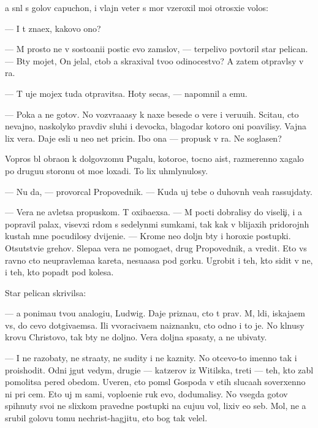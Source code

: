 \documentclass[10pt]{book}
\begin{document}
{\Y}a sn{\ia}l s golov{\yi} capuchon, i vlajn{\yi}{\y} veter s mor{\ia} vz{\y}eroxil mo{\y}i otrosxi{\y}e volos{\yi}:

— I t{\yi} zna{\y}ex, kakovo ono?

— M{\yi} prosto ne v sosto{\y}ani{\y}i postic {\Y}evo zam{\yi}slov, — terpelivo povtoril star{\yi}{\y} pelican. — B{\yi}ty mojet, On jelal, ctob{\yi} {\y}a skraxival tvo{\y}o odinocestvo? A zatem otpravl{\io}sy v ra{\y}.

— T{\yi} uje mojex tuda otpravitsa. Hoty se{\y}cas, — napomnil {\y}a {\y}emu.

— Poka {\y}a ne gotov. No vozvra{\x}a{\y}asy k naxe{\y} besede o vere i veru{\y}u{\x}ih. Scita{\y}u, cto nevajno, naskolyko pravdiv{\yi} sluhi i devocka, blagodar{\ia} kotoro{\y} oni po{\y}avilisy. Vajna lix vera. Daje {\y}esli u ne{\y}o net pricin{\yi}. Ibo ona — propusk v ra{\y}. Ne soglasen?

Vopros b{\yi}l obra{\x}on k dolgov{\ia}zomu Pugalu, kotoro{\y}e, tocno aist, razmerenno xagalo po drugu{\y}u storonu ot mo{\y}e{\y} loxadi. To lix uhm{\yi}lynulosy.

— Nu da, — provorcal Propovednik. — Kuda uj tebe o duhovn{\yi}h ve{\x}ah rassujdaty.

— Vera ne {\y}avl{\ia}{\y}etsa propuskom. T{\yi} oxiba{\y}exsa. — M{\yi} pocti dobralisy do viseli{\c}i, i {\y}a popravil palax, visevxi{\y} r{\ia}dom s sedelyn{\yi}mi sumkami, tak kak v blija{\y}xih pridorojn{\yi}h kustah mne pocudilosy dvijeni{\y}e. — Krome ne{\y}o doljn{\yi} b{\yi}ty i horoxi{\y}e postupki. Otsutstvi{\y}e grehov. Slepa{\y}a vera ne pomoga{\y}et, drug Propovednik, a vredit. Eto vs{\e} ravno cto neupravl{\ia}{\y}ema{\y}a kareta, nesu{\x}a{\y}asa pod gorku. Ugrobit i teh, kto sidit v ne{\y}, i teh, kto popad{\e}t pod kolesa.

Star{\yi}{\y} pelican skrivilsa:

— {\Y}a ponima{\y}u tvo{\y}u analogi{\y}u, Ludwig. Daje prizna{\y}u, cto t{\yi} prav. M{\yi}, l{\io}di, iskaja{\y}em vs{\e}, do cevo dot{\ia}giva{\y}emsa. Ili v{\yi}voraciva{\y}em naiznanku, cto odno i to je. No kl{\ia}nusy krov{\y}u Christovo{\y}, tak b{\yi}ty ne doljno. Vera doljna spasaty, a ne ubivaty.

— I ne razob{\x}aty, ne stra{\x}aty, ne sudity i ne kaznity. No otcevo-to imenno tak i proishodit. Odni jgut vedym, drugi{\y}e — katzerov iz Witilska, tret{\yf}i — teh, kto zab{\yi}l pomolitsa pered obedom. Uveren, cto pom{\yi}sl{\yi} Gospoda v etih sluca{\y}ah soverxenno ni pri cem. Eto uj m{\yi} sami, voplo{\x}eni{\y}e ruk {\y}evo, dodumalisy. No vsegda gotov{\yi} spihnuty svo{\y}i ne slixkom pravedn{\yi}{\y}e postupki na cuju{\y}u vol{\io}, lixiv {\y}e{\y}o seb{\ia}. Mol, ne {\y}a srubil golovu tomu nechrist{\io}-hagjitu, eto bog tak velel.
\end{document}
